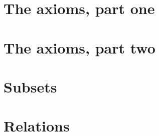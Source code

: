 \documentclass{article}
\begin{document}
  \begin{multicols}{2}
    \setcounter{section}{1}
    \noindent\section{The axioms, part one}
    
    
    
    
    
    
    \noindent\section{The axioms, part two}
    
    
    
    
    \noindent\section{Subsets}
    
    
    
    
    \noindent\section{Relations}
    
    
    

\end{multicols}
\end{document}
